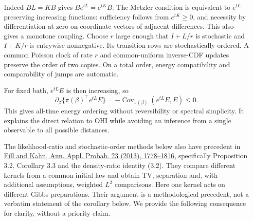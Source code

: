 \documentclass[11pt]{article}
\newcommand{\Cov}{\operatorname{Cov}}
\begin{document}
Indeed $BL=KB$ gives $Be^{tL}=e^{tK}B$. The Metzler condition is equivalent to $e^{tL}$ preserving increasing functions: sufficiency follows from $e^{tK}\geq0$, and necessity by differentiation at zero on coordinate vectors of adjacent differences. This also gives a monotone coupling. Choose $r$ large enough that $I+L/r$ is stochastic and $I+K/r$ is entrywise nonnegative. Its transition rows are stochastically ordered. A common Poisson clock of rate $r$ and common-uniform inverse-CDF updates preserve the order of two copies. On a total order, energy compatibility and comparability of jumps are automatic.

For fixed bath, $e^{tL}E$ is then increasing, so
\[
\partial_\beta\{\pi(\beta)^\top e^{tL}E\}
=-\Cov_{\pi(\beta)}(e^{tL}E,E)\leq0.
\]
This gives all-time energy ordering without reversibility or spectral simplicity. It explains the direct relation to OHI while avoiding an inference from a single observable to all possible distances.

The likelihood-ratio and stochastic-order methods below also have precedent in \href{https://arxiv.org/abs/1109.6075}{Fill and Kahn, Ann. Appl. Probab. 23 (2013), 1778--1816}, specifically Proposition 3.2, Corollary 3.3 and the density-ratio identity (3.2). They compare different kernels from a common initial law and obtain TV, separation and, with additional assumptions, weighted $L^2$ comparisons. Here one kernel acts on different Gibbs preparations. Their argument is a methodological precedent, not a verbatim statement of the corollary below. We provide the following consequence for clarity, without a priority claim.
\end{document}

